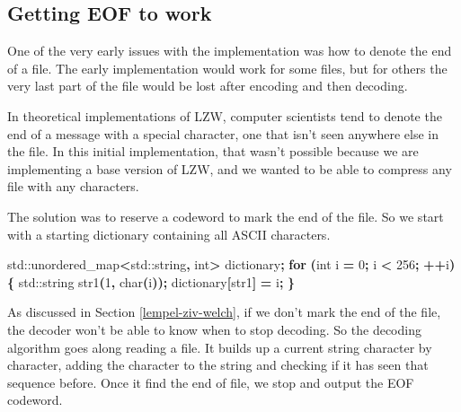 \documentclass[12pt,twoside]{reedthesis}
\newenvironment{Shaded}{\begin{snugshade}}{\end{snugshade}}
\newcommand{\BuiltInTok}[1]{#1}
\newcommand{\ControlFlowTok}[1]{\textcolor[rgb]{0.13,0.29,0.53}{\textbf{#1}}}
\newcommand{\DataTypeTok}[1]{\textcolor[rgb]{0.13,0.29,0.53}{#1}}
\newcommand{\DecValTok}[1]{\textcolor[rgb]{0.00,0.00,0.81}{#1}}
\newcommand{\NormalTok}[1]{#1}
\newcommand{\OperatorTok}[1]{\textcolor[rgb]{0.81,0.36,0.00}{\textbf{#1}}}
\begin{document}
\hypertarget{getting-eof-to-work}{%
\subsection{Getting EOF to work}\label{getting-eof-to-work}}

One of the very early issues with the implementation was how to denote the end of a file. The early implementation would work for some files, but for others the very last part of the file would be lost after encoding and then decoding.

In theoretical implementations of LZW, computer scientists tend to denote the end of a message with a special character, one that isn't seen anywhere else in the file. In this initial implementation, that wasn't possible because we are implementing a base version of LZW, and we wanted to be able to compress any file with any characters.

The solution was to reserve a codeword to mark the end of the file. So we start with a starting dictionary containing all ASCII characters.
\begin{Shaded}
\begin{Highlighting}[]
    \BuiltInTok{std::}\NormalTok{unordered\_map}\OperatorTok{\textless{}}\BuiltInTok{std::}\NormalTok{string}\OperatorTok{,} \DataTypeTok{int}\OperatorTok{\textgreater{}}\NormalTok{ dictionary}\OperatorTok{;}
    \ControlFlowTok{for} \OperatorTok{(}\DataTypeTok{int}\NormalTok{ i }\OperatorTok{=} \DecValTok{0}\OperatorTok{;}\NormalTok{ i }\OperatorTok{\textless{}} \DecValTok{256}\OperatorTok{;} \OperatorTok{++}\NormalTok{i}\OperatorTok{)\{}
        \BuiltInTok{std::}\NormalTok{string}\OperatorTok{ }\NormalTok{str1}\OperatorTok{(}\DecValTok{1}\OperatorTok{,} \DataTypeTok{char}\OperatorTok{(}\NormalTok{i}\OperatorTok{));}
\NormalTok{        dictionary}\OperatorTok{[}\NormalTok{str1}\OperatorTok{]} \OperatorTok{=}\NormalTok{ i}\OperatorTok{;}
    \OperatorTok{\}}
\end{Highlighting}
\end{Shaded}
As discussed in Section \ref{lempel-ziv-welch}, if we don't mark the end of the file, the decoder won't be able to know when to stop decoding. So the decoding algorithm goes along reading a file. It builds up a current string character by character, adding the character to the string and checking if it has seen that sequence before. Once it find the end of file, we stop and output the EOF codeword.
\end{document}
